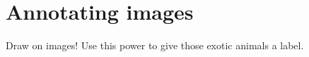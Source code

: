 \documentclass[12pt]{article}
\begin{document}
\section*{Annotating images}

Draw on images! Use this power to give those exotic animals a label.
\vspace{1em}

\end{document}

